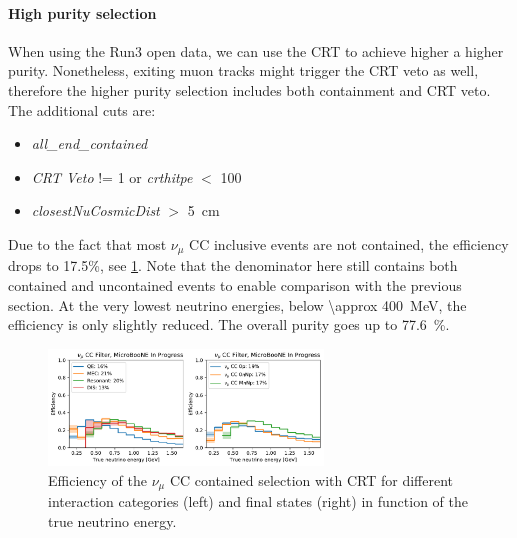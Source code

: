 \paragraph{High purity selection}
When using the Run3 open data, we can use the CRT to achieve higher a higher purity. Nonetheless, exiting muon tracks might trigger the CRT veto as well, therefore the higher purity selection includes both containment and CRT veto. The additional cuts are:
\begin{itemize}
    \item \textit{all\_end\_contained}
    \item \textit{CRT Veto} != 1 or \textit{crthitpe} $<$ 100
    \item \textit{closestNuCosmicDist} $>$ \SI{5}{\cm}
\end{itemize}
Due to the fact that most $\nu_\mu$ CC inclusive events are not contained, the efficiency drops to 17.5\%, see \cref{fig:numu:eff_r3}. Note that the denominator here still contains both contained and uncontained events to enable comparison with the previous section. At the very lowest neutrino energies, below \SI{\approx 400}{\MeV}, the efficiency is only slightly reduced. The overall purity goes up to \SI{77.6}{\%}. 

\begin{figure}[H]
    \centering
    \includegraphics[width=0.65\textwidth]{NuMuCCsel/Images/run3/numu_efficiency_run3.pdf}
    \caption{Efficiency of the $\nu_\mu$ CC contained selection with CRT for different interaction categories (left) and final states (right) in function of the true neutrino energy.}
    \label{fig:numu:eff_r3}
\end{figure}

